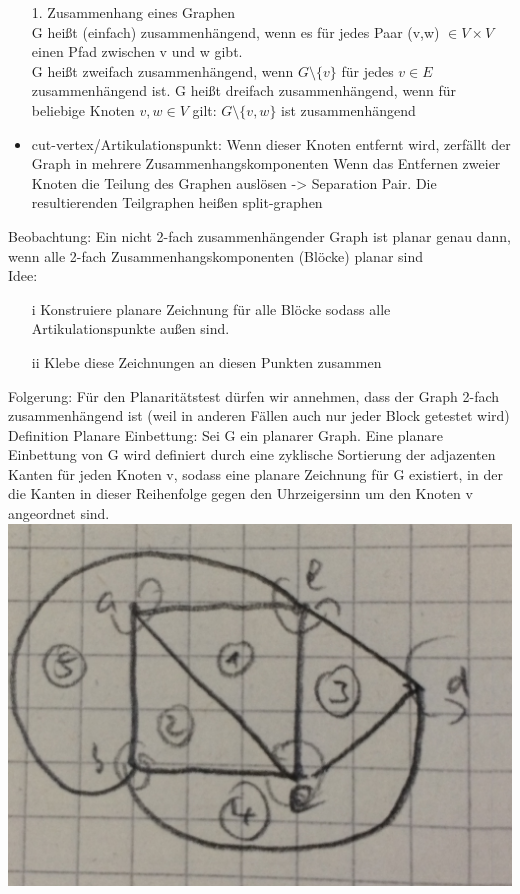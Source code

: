 \documentclass[a4paper]{article}
\begin{document}
\begin{itemize}
\item[1. ]Zusammenhang eines Graphen\\
G heißt (einfach) zusammenhängend, wenn es für jedes Paar (v,w) $\in V\times V$ einen Pfad zwischen v und w gibt.\\
G heißt zweifach zusammenhängend, wenn $G\setminus \{v\}$ für jedes $v\in E$ zusammenhängend ist.
G heißt dreifach zusammenhängend, wenn für beliebige Knoten $v,w\in V$ gilt: $G\setminus \{v,w\}$ ist zusammenhängend
\item cut-vertex/Artikulationspunkt: Wenn dieser Knoten entfernt wird, zerfällt der Graph in mehrere Zusammenhangskomponenten
Wenn das Entfernen zweier Knoten die Teilung des Graphen auslösen -> Separation Pair. Die resultierenden Teilgraphen heißen split-graphen
\end{itemize}
Beobachtung: Ein nicht 2-fach zusammenhängender Graph ist planar genau dann, wenn alle 2-fach Zusammenhangskomponenten (Blöcke) planar sind\\
Idee: \begin{itemize}
\item[i] Konstruiere planare Zeichnung für alle Blöcke sodass alle Artikulationspunkte außen sind.
\item[ii] Klebe diese Zeichnungen an diesen Punkten zusammen
\end{itemize}
Folgerung: Für den Planaritätstest dürfen wir annehmen, dass der Graph 2-fach zusammenhängend ist (weil in anderen Fällen auch nur jeder Block getestet wird)\\
Definition Planare Einbettung: Sei G ein planarer Graph. Eine planare Einbettung von G wird definiert durch eine zyklische Sortierung der adjazenten Kanten für jeden Knoten v, sodass eine planare Zeichnung für G existiert, in der die Kanten in dieser Reihenfolge gegen den Uhrzeigersinn um den Knoten v angeordnet sind.\\
\includegraphics[scale=0.05]{12.png}\\
\end{document}
